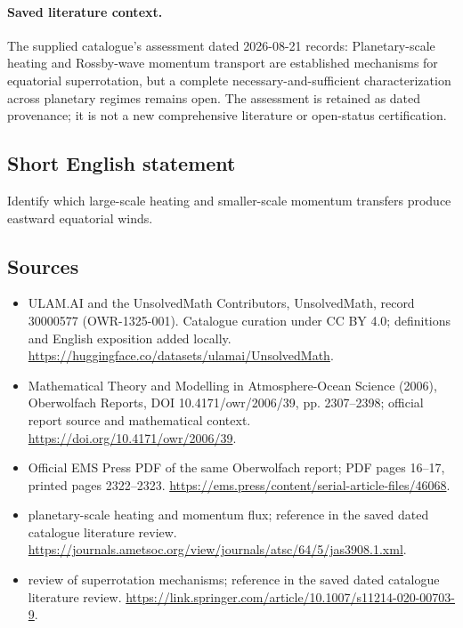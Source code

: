 \documentclass[11pt]{article}
\begin{document}
\paragraph{Saved literature context.} The supplied catalogue's assessment dated 2026-08-21 records: Planetary-scale heating and Rossby-wave momentum transport are established mechanisms for equatorial superrotation, but a complete necessary-and-sufficient characterization across planetary regimes remains open. The assessment is retained as dated provenance; it is not a new comprehensive literature or open-status certification.
\subsection{Short English statement}
Identify which large-scale heating and smaller-scale momentum transfers produce eastward equatorial winds.
\subsection{Sources}
\begin{itemize}
\item[\hypertarget{source:30000577:1}{S1}] ULAM.AI and the UnsolvedMath Contributors, UnsolvedMath, record 30000577 (OWR-1325-001). Catalogue curation under CC BY 4.0; definitions and English exposition added locally.
\url{https://huggingface.co/datasets/ulamai/UnsolvedMath}.
\item[\hypertarget{source:30000577:2}{S2}] Mathematical Theory and Modelling in Atmosphere-Ocean Science (2006), Oberwolfach Reports, DOI 10.4171/owr/2006/39, pp. 2307--2398; official report source and mathematical context.
\url{https://doi.org/10.4171/owr/2006/39}.
\item[\hypertarget{source:30000577:3}{S3}] Official EMS Press PDF of the same Oberwolfach report; PDF pages 16--17, printed pages 2322--2323.
\url{https://ems.press/content/serial-article-files/46068}.
\item[\hypertarget{source:30000577:4}{S4}] planetary-scale heating and momentum flux; reference in the saved dated catalogue literature review.
\url{https://journals.ametsoc.org/view/journals/atsc/64/5/jas3908.1.xml}.
\item[\hypertarget{source:30000577:5}{S5}] review of superrotation mechanisms; reference in the saved dated catalogue literature review.
\url{https://link.springer.com/article/10.1007/s11214-020-00703-9}.
\end{itemize}
\label{end:30000577}
\end{document}
